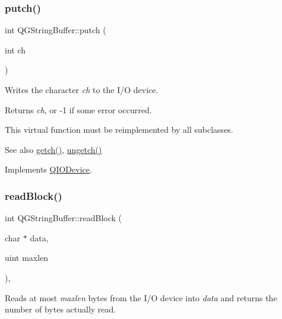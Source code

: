 \mbox{\label{class_q_g_string_buffer_ae2265be83385ba58ff0e47880563bbb5}} 
\subsubsection{\texorpdfstring{putch()}{putch()}}
{\footnotesize\ttfamily int Q\+G\+String\+Buffer\+::putch (\begin{DoxyParamCaption}\item[{int}]{ch }\end{DoxyParamCaption})\hspace{0.3cm}{\ttfamily [virtual]}}

Writes the character {\itshape ch} to the I/O device.

Returns {\itshape ch}, or -\/1 if some error occurred.

This virtual function must be reimplemented by all subclasses.

\begin{DoxySeeAlso}{See also}
\mbox{\hyperlink{class_q_g_string_buffer_a20699e4c4ba6d7d68c4422d795412751}{getch()}}, \mbox{\hyperlink{class_q_g_string_buffer_a6e97e3b078054bdeb5ee62d6970e7863}{ungetch()}} 
\end{DoxySeeAlso}


Implements \mbox{\hyperlink{class_q_i_o_device_a5de5c1c1cba7ca36ba93289e30cd3029}{Q\+I\+O\+Device}}.

\mbox{\label{class_q_g_string_buffer_aa5ab1052c6a1a9365418f55c55022fb2}} 
\subsubsection{\texorpdfstring{readBlock()}{readBlock()}}
{\footnotesize\ttfamily int Q\+G\+String\+Buffer\+::read\+Block (\begin{DoxyParamCaption}\item[{char $\ast$}]{data,  }\item[{uint}]{maxlen }\end{DoxyParamCaption})\hspace{0.3cm}{\ttfamily [inline]}, {\ttfamily [virtual]}}

Reads at most {\itshape maxlen} bytes from the I/O device into {\itshape data} and returns the number of bytes actually read.

